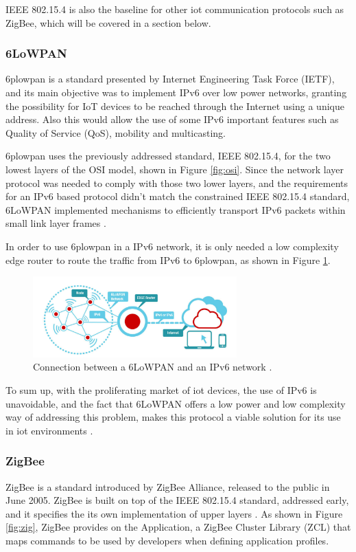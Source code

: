 IEEE 802.15.4 is also the baseline for other \ac{iot} communication protocols such as ZigBee, which will be covered in a section below.


\subsubsection{6LoWPAN}
\acf{6plowpan} is a standard presented by Internet Engineering Task Force (IETF), and its main objective was to implement IPv6 over low power networks, granting the possibility for IoT devices to be reached through the Internet using a unique address. Also this would allow the use of some IPv6 important features such as Quality of Service (QoS), mobility and multicasting.

\ac{6plowpan} uses the previously addressed standard, IEEE 802.15.4, for the two lowest layers of the OSI model, shown in Figure \ref{fig:osi}. Since the network layer protocol was needed to comply with those two lower layers, and the requirements for an IPv6 based protocol didn't match the constrained IEEE 802.15.4 standard, 6LoWPAN implemented mechanisms to efficiently transport IPv6 packets within small link layer frames \cite{chalappuram2016}. 

In order to use \ac{6plowpan} in a IPv6 network, it is only needed a low complexity edge router to route the traffic from IPv6 to \ac{6plowpan}, as shown in Figure \ref{fig:6low}. 

\begin{figure}[H]
	\centering
	\includegraphics[width=0.7\textwidth]{figures/edge.png}
	\caption{Connection between a 6LoWPAN and an IPv6 network \cite{6low}.}
	\label{fig:6low}
\end{figure}


To sum up, with the proliferating market of \ac{iot} devices, the use of IPv6 is unavoidable, and the fact that 6LoWPAN offers a low power and low complexity way of addressing this problem, makes this protocol a viable solution for its use in \ac{iot} environments \cite{Mehboob2016}.  


\subsubsection{ZigBee}
ZigBee is a standard introduced by ZigBee Alliance, released to the public in June 2005. ZigBee is built on top of the IEEE 802.15.4 standard, addressed early, and it specifies the its own implementation of upper layers \cite{INSTEON2013}. As shown in Figure \ref{fig:zig}, ZigBee provides on the Application, a ZigBee Cluster Library (ZCL) that maps commands to be used by developers when defining application profiles.


